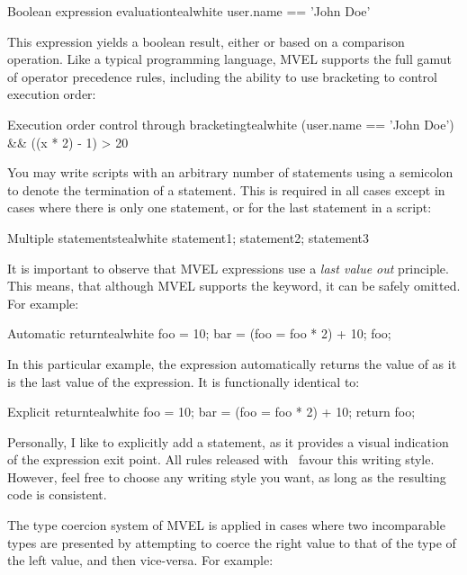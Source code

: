 \begin{codebox}{Boolean expression evaluation}{teal}{\icnote}{white}
user.name == 'John Doe'
\end{codebox}

This expression yields a boolean result, either  or  based on a comparison operation. Like a typical programming language, \gls{MVEL} supports the full gamut of operator precedence rules, including the ability to use bracketing to control execution order:

\begin{codebox}{Execution order control through bracketing}{teal}{\icnote}{white}
(user.name == 'John Doe') && ((x * 2) - 1) > 20
\end{codebox}

You may write scripts with an arbitrary number of statements using a semicolon to denote the termination of a statement. This is required in all cases except in cases where there is only one statement, or for the last statement in a script:

\begin{codebox}{Multiple statements}{teal}{\icnote}{white}
statement1; statement2; statement3
\end{codebox}

It is important to observe that \gls{MVEL} expressions use a \emph{last value out} principle. This means, that although \gls{MVEL} supports the  keyword, it can be safely omitted. For example:

\begin{codebox}{Automatic return}{teal}{\icnote}{white}
foo = 10;
bar = (foo = foo * 2) + 10;
foo;
\end{codebox}

In this particular example, the expression automatically returns the value of  as it is the last value of the expression. It is functionally identical to:

\begin{codebox}{Explicit return}{teal}{\icnote}{white}
foo = 10;
bar = (foo = foo * 2) + 10;
return foo;
\end{codebox}

Personally, I like to explicitly add a  statement, as it provides a visual indication of the expression exit point. All rules released with \arara\ favour this writing style. However, feel free to choose any writing style you want, as long as the resulting code is consistent.

The type coercion system of \gls{MVEL} is applied in cases where two incomparable types are presented by attempting to coerce the right value to that of the type of the left value, and then vice-versa. For example:

